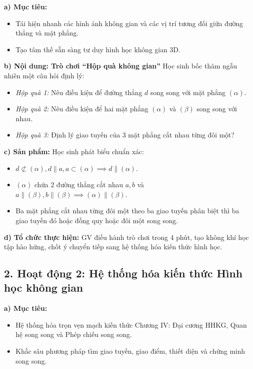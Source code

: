 \documentclass[12pt, a4paper]{article}
\begin{document}
\noindent \textbf{a) Mục tiêu:}
\begin{itemize}
    \item Tái hiện nhanh các hình ảnh không gian và các vị trí tương đối giữa đường thẳng và mặt phẳng.
    \item Tạo tâm thế sẵn sàng tư duy hình học không gian 3D.
\end{itemize}

\noindent \textbf{b) Nội dung: Trò chơi ``Hộp quà không gian''}
Học sinh bốc thăm ngẫu nhiên một câu hỏi định lý:
\begin{itemize}
    \item \textit{Hộp quà 1:} Nêu điều kiện để đường thẳng $d$ song song với mặt phẳng $(\alpha)$.
    \item \textit{Hộp quà 2:} Nêu điều kiện để hai mặt phẳng $(\alpha)$ và $(\beta)$ song song với nhau.
    \item \textit{Hộp quà 3:} Định lý giao tuyến của 3 mặt phẳng cắt nhau từng đôi một?
\end{itemize}

\noindent \textbf{c) Sản phẩm:}
Học sinh phát biểu chuẩn xác:
\begin{itemize}
    \item $d \not\subset (\alpha), d \parallel a, a \subset (\alpha) \implies d \parallel (\alpha)$.
    \item $(\alpha)$ chứa 2 đường thẳng cắt nhau $a, b$ và $a \parallel (\beta), b \parallel (\beta) \implies (\alpha) \parallel (\beta)$.
    \item Ba mặt phẳng cắt nhau từng đôi một theo ba giao tuyến phân biệt thì ba giao tuyến đó hoặc đồng quy hoặc đôi một song song.
\end{itemize}

\noindent \textbf{d) Tổ chức thực hiện:}
GV điều hành trò chơi trong 4 phút, tạo không khí học tập hào hứng, chốt ý chuyển tiếp sang hệ thống hóa kiến thức hình học.

\subsection*{2. Hoạt động 2: Hệ thống hóa kiến thức Hình học không gian}

\noindent \textbf{a) Mục tiêu:}
\begin{itemize}
    \item Hệ thống hóa trọn vẹn mạch kiến thức Chương IV: Đại cương HHKG, Quan hệ song song và Phép chiếu song song.
    \item Khắc sâu phương pháp tìm giao tuyến, giao điểm, thiết diện và chứng minh song song.
\end{itemize}
\end{document}
